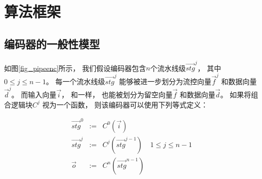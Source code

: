 %
%
%
%
%
%
%


\section{算法框架}\label{sec_framework}


\subsection{编码器的一般性模型}
如图\ref{fig_pipeenc}所示，
我们假设编码器包含$n$个流水线级$\vec{stg}^j$，
其中$0\le j \le n-1$。
每一个流水线级$\vec{stg}^j$ 能够被进一步划分为流控向量$\vec{f}^j$ 和数据向量$\vec{d}^j$。
而输入向量$\vec{i}$，
和一样，
也能被划分为留空向量$\vec{f}$ 和数据向量$\vec{d}$。
如果将组合逻辑块$C^j$ 视为一个函数，
则该编码器可以使用下列等式定义：

\begin{equation}\label{equ_genpipe}
\begin{array}{cccc}
\vec{stg}^0   & := & C^0(\vec{i})         &\\
\vec{stg}^j   & := & C^j(\vec{stg}^{j-1}) & 1\le j\le n-1\\
\vec{o}       & := & C^n(\vec{stg}^{n-1}) &
\end{array}
\end{equation}


